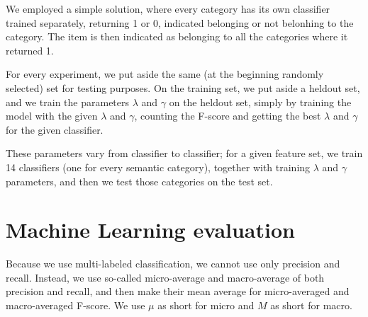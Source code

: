 \documentclass[letterpaper]{article}
\newcommand{\todofn}[1] {
 \footnote{\textbf{TODO : #1}}}
\begin{document}
We employed a simple solution, where every category has its own classifier trained separately, returning 1 or 0, indicated 
belonging or not belonhing to the category. The item is then indicated as belonging to all the categories where it returned 1.

For every experiment, we put aside the same (at the beginning randomly selected) set for testing purposes. 
On the training set, we put aside a heldout set, and we train the parameters $\lambda$ and $\gamma$ on the heldout set, simply by training the model with the given $\lambda$ and $\gamma$, counting the F-score and getting the best $\lambda$ and $\gamma$ for the given classifier.

These parameters vary from classifier to classifier; for a given feature set, we train 14 classifiers (one for every semantic category), together with training $\lambda$ and $\gamma$ parameters, and then we test those categories on the test set.

%
%
%
%
%

\section{Machine Learning evaluation}
Because we use multi-labeled classification, we cannot use only precision and recall. Instead, we use so-called micro-average and macro-average of both precision and recall, and then make their mean average for micro-averaged and macro-averaged F-score. We use $\mu$ as short for micro and $M$ as short for macro.
\end{document}
